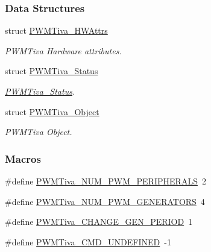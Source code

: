 \subsubsection*{Data Structures}
\begin{DoxyCompactItemize}
\item 
struct \hyperlink{struct_p_w_m_tiva___h_w_attrs}{P\-W\-M\-Tiva\-\_\-\-H\-W\-Attrs}
\begin{DoxyCompactList}\small\item\em P\-W\-M\-Tiva Hardware attributes. \end{DoxyCompactList}\item 
struct \hyperlink{struct_p_w_m_tiva___status}{P\-W\-M\-Tiva\-\_\-\-Status}
\begin{DoxyCompactList}\small\item\em \hyperlink{struct_p_w_m_tiva___status}{P\-W\-M\-Tiva\-\_\-\-Status}. \end{DoxyCompactList}\item 
struct \hyperlink{struct_p_w_m_tiva___object}{P\-W\-M\-Tiva\-\_\-\-Object}
\begin{DoxyCompactList}\small\item\em P\-W\-M\-Tiva Object. \end{DoxyCompactList}\end{DoxyCompactItemize}
\subsubsection*{Macros}
\begin{DoxyCompactItemize}
\item 
\#define \hyperlink{_p_w_m_tiva_8h_ad09ddba586142f79c3c6ad6eae017374}{P\-W\-M\-Tiva\-\_\-\-N\-U\-M\-\_\-\-P\-W\-M\-\_\-\-P\-E\-R\-I\-P\-H\-E\-R\-A\-L\-S}~2
\item 
\#define \hyperlink{_p_w_m_tiva_8h_a3b71203004a2bad6632936ac4d7274de}{P\-W\-M\-Tiva\-\_\-\-N\-U\-M\-\_\-\-P\-W\-M\-\_\-\-G\-E\-N\-E\-R\-A\-T\-O\-R\-S}~4
\item 
\#define \hyperlink{_p_w_m_tiva_8h_ae8518cd9113b2c8c7d671f391d0f82fd}{P\-W\-M\-Tiva\-\_\-\-C\-H\-A\-N\-G\-E\-\_\-\-G\-E\-N\-\_\-\-P\-E\-R\-I\-O\-D}~1
\item 
\#define \hyperlink{_p_w_m_tiva_8h_ad8c7622ea39bdeca508029fd17b51cea}{P\-W\-M\-Tiva\-\_\-\-C\-M\-D\-\_\-\-U\-N\-D\-E\-F\-I\-N\-E\-D}~-\/1
\end{DoxyCompactItemize}
